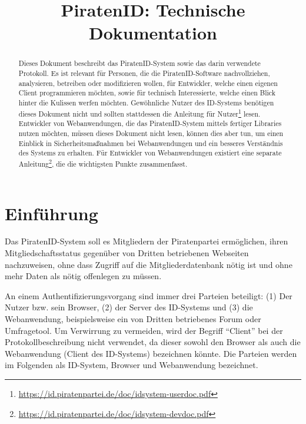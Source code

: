 

\title{PiratenID: Technische Dokumentation}


\maketitle

\begin{abstract}Dieses Dokument beschreibt das PiratenID-System sowie das darin verwendete Protokoll.
Es ist relevant für Personen, die die PiratenID-Software nachvollziehen, analysieren, betreiben oder modifizieren wollen,
für Entwickler, welche einen eigenen Client programmieren möchten, sowie für technisch Interessierte, welche einen Blick hinter die Kulissen werfen möchten.
Gewöhnliche Nutzer des ID-Systems benötigen dieses Dokument nicht und sollten stattdessen die Anleitung für Nutzer\footnote{\url{https://id.piratenpartei.de/doc/idsystem-userdoc.pdf}} lesen.
Entwickler von Webanwendungen, die das PiratenID-System mittels fertiger Libraries nutzen möchten, müssen dieses Dokument nicht lesen,
können dies aber tun, um einen Einblick in Sicherheitsmaßnahmen bei Webanwendungen und ein besseres Verständnis des Systems zu erhalten.
Für Entwickler von Webanwendungen existiert eine separate Anleitung\footnote{\url{https://id.piratenpartei.de/doc/idsystem-devdoc.pdf}}, die die wichtigsten Punkte zusammenfasst.
\end{abstract}

\newpage

{
\small
\tableofcontents
}

\newpage

\section{Einführung}
Das PiratenID-System soll es Mitgliedern der Piratenpartei ermöglichen, ihren Mitgliedschaftsstatus gegenüber von Dritten betriebenen Webseiten nachzuweisen,
ohne dass Zugriff auf die Mitgliederdatenbank nötig ist und ohne mehr Daten als nötig offenlegen zu müssen.

An einem Authentifizierungsvorgang sind immer drei Parteien beteiligt: (1) Der Nutzer bzw. sein Browser, (2) der Server des ID-Systems und (3) die Webanwendung,
beispielsweise ein von Dritten betriebenes Forum oder Umfragetool.
Um Verwirrung zu vermeiden, wird der Begriff "`Client"' bei der Protokollbeschreibung nicht verwendet,
da dieser sowohl den Browser als auch die Webanwendung (Client des ID-Systems) bezeichnen könnte.
Die Parteien werden im Folgenden als ID-System, Browser und Webanwendung bezeichnet.


